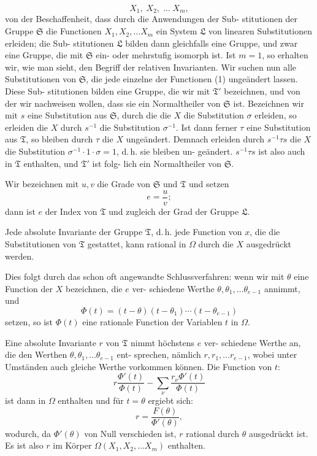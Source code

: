 \documentclass[12pt,a4paper]{article}
\theoremstyle{plain}
\theoremstyle{definition}
\theoremstyle{remark}
\begin{document}
\begin{equation}\label{eq:46_1}
X_1,\; X_2,\; \ldots\; X_m,\tag{1}
\end{equation}
von der Beschaffenheit, dass durch die Anwendungen der Sub-
stitutionen der Gruppe $\mathfrak{S}$ die Functionen $X_1, X_2, \ldots X_m$ ein
System $\mathfrak{L}$ von linearen Substitutionen erleiden; die Sub-
stitutionen $\mathfrak{L}$ bilden dann gleichfalls eine Gruppe, und zwar
eine Gruppe, die mit $\mathfrak{S}$ ein- oder mehrstufig isomorph ist. Ist
$m=1$, so erhalten wir, wie man sieht, den Begriff der relativen
Invarianten. Wir suchen nun alle Substitutionen von $\mathfrak{S}$, die
jede einzelne der Functionen (1) unge\"andert lassen. Diese Sub-
stitutionen bilden eine Gruppe, die wir mit $\mathfrak{T}'$ bezeichnen, und
von der wir nachweisen wollen, dass sie ein Normaltheiler von
$\mathfrak{S}$ ist. Bezeichnen wir mit $s$ eine Substitution aus $\mathfrak{S}$, durch die
die $X$ die Substitution $\sigma$ erleiden, so erleiden die $X$ durch $s^{-1}$
die Substitution $\sigma^{-1}$. Ist dann ferner $\tau$ eine Substitution aus $\mathfrak{T}$,
so bleiben durch $\tau$ die $X$ unge\"andert. Demnach erleiden durch
$s^{-1}\tau s$ die $X$ die Substitution $\sigma^{-1}\cdot 1 \cdot \sigma = 1$, d.\,h. sie bleiben un-
ge\"andert. $s^{-1}\tau s$ ist also auch in $\mathfrak{T}$ enthalten, und $\mathfrak{T}'$ ist folg-
lich ein Normaltheiler von $\mathfrak{S}$.

Wir bezeichnen mit $u, v$ die Grade von $\mathfrak{S}$ und $\mathfrak{T}$ und setzen
\[
e = \frac{u}{v};
\]
dann ist $e$ der Index von $\mathfrak{T}$ und zugleich der Grad der Gruppe $\mathfrak{L}$.

Jede absolute Invariante der Gruppe $\mathfrak{T}$, d.\,h. jede Function
von $x$, die die Substitutionen von $\mathfrak{T}$ gestattet, kann rational in
$\Omega$ durch die $X$ ausgedr\"uckt werden.

Dies folgt durch das schon oft angewandte Schlussverfahren:
wenn wir mit $\theta$ eine Function der $X$ bezeichnen, die $e$ ver-
schiedene Werthe $\theta, \theta_1, \ldots \theta_{e-1}$ annimmt, und
\begin{equation}\label{eq:46_2}
\Phi(t)=(t-\theta)(t-\theta_1)\cdots(t-\theta_{e-1})\tag{2}
\end{equation}
setzen, so ist $\Phi(t)$ eine rationale Function der Variablen $t$ in $\Omega$.

Eine absolute Invariante $r$ von $\mathfrak{T}$ nimmt h\"ochstens $e$ ver-
schiedene Werthe an, die den Werthen $\theta, \theta_1, \ldots \theta_{e-1}$ ent-
sprechen, n\"amlich $r, r_1, \ldots r_{e-1}$, wobei unter Umst\"anden auch
gleiche Werthe vorkommen k\"onnen. Die Function von $t$:
\[
r\frac{\Phi'(t)}{\Phi(t)} - \sum_{\nu} \frac{r_\nu \Phi'(t)}{\Phi(t)}
\]
ist dann in $\Omega$ enthalten und f\"ur $t=\theta$ ergiebt sich:
\begin{equation}\label{eq:46_3}
r = \frac{F(\theta)}{\Phi'(\theta)},\tag{3}
\end{equation}
wodurch, da $\Phi'(\theta)$ von Null verschieden ist, $r$ rational durch $\theta$
ausgedr\"uckt ist. Es ist also $r$ im K\"orper $\Omega(X_1, X_2, \ldots X_m)$
enthalten.
\end{document}
